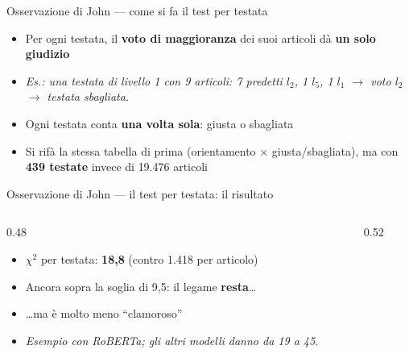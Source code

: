 \documentclass[aspectratio=169]{beamer}
\newcommand{\hl}[1]{\textbf{#1}}
\begin{document}
\begin{frame}{Osservazione di John --- come si fa il test per testata}
  \vfill
  \begin{itemize}[<+->]
    \setlength\itemsep{0.8em}
    \item Per ogni testata, il \hl{voto di maggioranza} dei suoi articoli d\`a \hl{un solo giudizio}
    \item[] {\small\itshape Es.: una testata di livello 1 con 9 articoli: 7 predetti $l_2$, 1 $l_5$, 1 $l_1$ $\rightarrow$ voto $l_2$ $\rightarrow$ testata sbagliata.}
    \item Ogni testata conta \hl{una volta sola}: giusta o sbagliata
    \item Si rif\`a la stessa tabella di prima (orientamento $\times$ giusta/sbagliata), ma con \hl{439 testate} invece di 19.476 articoli
  \end{itemize}
  \vfill
\end{frame}

\begin{frame}{Osservazione di John --- il test per testata: il risultato}
  \begin{columns}[c]
    \begin{column}{0.48\textwidth}
      \begin{itemize}[<+->]
        \setlength\itemsep{0.8em}
        \item $\chi^2$ per testata: \hl{18,8} (contro 1.418 per articolo)
        \item Ancora sopra la soglia di 9,5: il legame \hl{resta}\dots
        \item \dots ma \`e molto meno ``clamoroso''
        \item[] {\small\itshape Esempio con RoBERTa; gli altri modelli danno da 19 a 45.}
      \end{itemize}
    \end{column}
    \begin{column}{0.52\textwidth}
    \end{column}
  \end{columns}
\end{frame}
\end{document}
